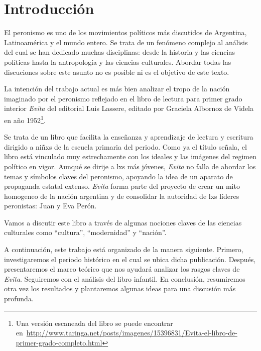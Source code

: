 \section{Introducción}
El peronismo es uno de los movimientos políticos más discutidos de Argentina, Latinoamérica y el mundo entero.
Se trata de un fenómeno complejo al análisis del cual se han dedicado muchas disciplinas: desde la historia y las ciencias políticas hasta la antropología y las ciencias culturales.
Abordar todas las discuciones sobre este asunto no es posible ni es el objetivo de este texto.

La intención del trabajo actual es más bien analizar el tropo de la nación imaginado por el peronismo reflejado en el libro de lectura para primer grado interior \textit{Evita} del editorial Luis Lassere, editado por Graciela Albornoz de Videla en año 1952\footnote{Una versión escaneada del libro se puede encontrar en~\url{http://www.taringa.net/posts/imagenes/15396831/Evita-el-libro-de-primer-grado-completo.html}}.

Se trata de un libro que facilita la enseñanza y aprendizaje de lectura y escritura dirigido a niñxs de la escuela primaria del periodo.
Como ya el título señala, el libro está vinculado muy estrechamente con los ideales y las imágenes del regimen político en vigor.
Aunqué se dirije a lxs más jóvenes, \textit{Evita} no falla de abordar los temas y símbolos claves del peronismo, apoyando la idea de un aparato de propaganda estatal extenso.
\textit{Evita} forma parte del proyecto de crear un mito homogeneo de la nación argentina
y de consolidar la autoridad de lxs líderes peronistas: Juan y Eva Perón.

Vamos a discutir este libro a través de algunas nociones claves de las ciencias culturales como ``cultura'', ``modernidad'' y ``nación''.

A continuación, este trabajo está organizado de la manera siguiente.
Primero, investigaremos el periodo histórico en el cual se ubica dicha publicación.
Después, presentaremos el marco teórico que nos ayudará analizar los rasgos claves de \textit{Evita}.
Seguiremos con el análisis del libro infantil.
En conclusión, resumiremos otra vez los resultados y plantaremos algunas ideas para una discusión más profunda.
